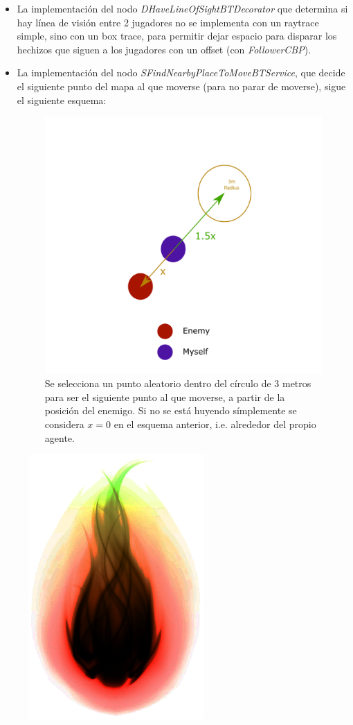 \documentclass[12pt]{article}
\begin{document}
\begin{itemize}
	\item La implementación del nodo \textit{\emph{DHaveLineOfSightBTDecorator}} que determina si hay línea de visión entre 2 jugadores no se implementa con un raytrace simple, sino con un box trace, para permitir dejar espacio para disparar los hechizos que siguen a los jugadores con un offset (con \textit{FollowerCBP}).
	\item La implementación del nodo \textit{\emph{SFindNearbyPlaceToMoveBTService}}, que decide el siguiente punto del mapa al que moverse (para no parar de moverse), sigue el siguiente esquema:
	\begin{figure}[H]
	    \centering
	    \includegraphics[width=1\textwidth]{positioning_scheme}
		\captionsetup{labelformat=empty}
	    \caption{Se selecciona un punto aleatorio dentro del círculo de 3 metros para ser el siguiente punto al que moverse, a partir de la posición del enemigo. Si no se está huyendo símplemente se considera $x = 0$ en el esquema anterior, i.e. alrededor del propio agente.}
	\end{figure}
\end{itemize}

\begin{figure}[h]
    \centering
    \includegraphics[width=0.6\textwidth]{fireball}
\end{figure}

\vfill
\end{document}
